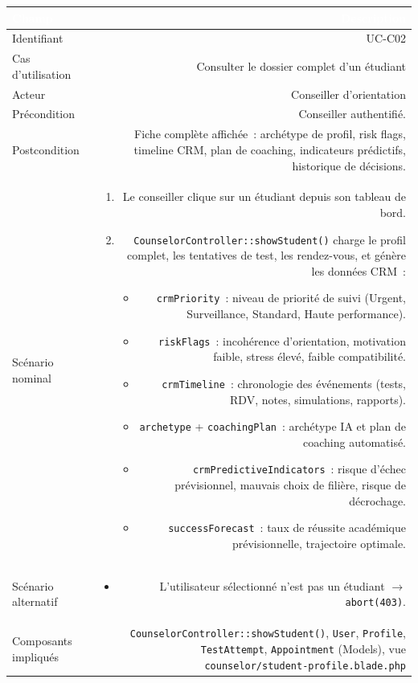 \documentclass[a4paper,12pt]{article}
\begin{document}
\noindent
\begin{tabular}{|L|R|}
\hline
{}\textcolor{white}{\textbf{Champ}} & \textcolor{white}{\textbf{Description}} \\
\hline
{}Identifiant & UC-C02 \\
\hline
Cas d'utilisation & Consulter le dossier complet d'un étudiant \\
\hline
{}Acteur & Conseiller d'orientation \\
\hline
Précondition & Conseiller authentifié. \\
\hline
{}Postcondition & Fiche complète affichée~: archétype de profil, risk flags, timeline CRM, plan de coaching, indicateurs prédictifs, historique de décisions. \\
\hline
Scénario nominal &
\begin{enumerate}
  \item Le conseiller clique sur un étudiant depuis son tableau de bord.
  \item \texttt{CounselorController::showStudent()} charge le profil complet, les tentatives de test, les rendez-vous, et génère les données CRM~:
  \begin{itemize}
    \item \texttt{crmPriority}~: niveau de priorité de suivi (Urgent, Surveillance, Standard, Haute performance).
    \item \texttt{riskFlags}~: incohérence d'orientation, motivation faible, stress élevé, faible compatibilité.
    \item \texttt{crmTimeline}~: chronologie des événements (tests, RDV, notes, simulations, rapports).
    \item \texttt{archetype} + \texttt{coachingPlan}~: archétype IA et plan de coaching automatisé.
    \item \texttt{crmPredictiveIndicators}~: risque d'échec prévisionnel, mauvais choix de filière, risque de décrochage.
    \item \texttt{successForecast}~: taux de réussite académique prévisionnelle, trajectoire optimale.
  \end{itemize}
\end{enumerate} \\
\hline
{}Scénario alternatif &
\begin{itemize}
  \item L'utilisateur sélectionné n'est pas un étudiant $\rightarrow$ \texttt{abort(403)}.
\end{itemize} \\
\hline
Composants impliqués & \texttt{CounselorController::showStudent()}, \texttt{User}, \texttt{Profile}, \texttt{TestAttempt}, \texttt{Appointment} (Models), vue \texttt{counselor/student-profile.blade.php} \\
\hline
\end{tabular}
\end{document}
